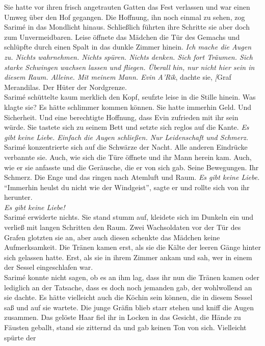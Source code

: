 Sie hatte vor ihren frisch angetrauten Gatten das Fest verlassen und war einen Umweg über den Hof 
gegangen. Die Hoffnung, ihn noch einmal zu sehen, zog Sarimé in das Mondlicht hinaus. Schließlich 
führten ihre Schritte sie aber doch zum Unvermeidbaren. Leise öffnete das Mädchen die Tür des 
Gemachs und schlüpfte durch einen Spalt in das dunkle Zimmer hinein. \textit{Ich mache die Augen 
zu. Nichts wahrnehmen. Nichts spüren. Nichts denken. Sich fort Träumen. Sich starke Schwingen 
wachsen lassen und fliegen. Überall hin, nur nicht hier sein in diesem Raum. Alleine. Mit meinem 
Mann. Evin A'Rik}, dachte sie, \textit[{Graf Merandilas. Der Hüter der Nordgrenze.}\\
Sarimé schüttelte kaum merklich den Kopf, seufzte leise in die Stille hinein. Was klagte sie? 
Es hätte schlimmer kommen können. Sie hatte immerhin Geld. Und Sicherheit. Und eine berechtigte 
Hoffnung, dass Evin zufrieden mit ihr sein würde. Sie tastete sich zu seinem Bett und setzte sich 
reglos auf die Kante. \textit{Es gibt keine Liebe. Einfach die Augen schließen. Nur Leidenschaft 
und Schmerz.}\\
Sarimé konzentrierte sich auf die Schwärze der Nacht. Alle anderen Eindrücke verbannte sie. Auch, 
wie sich die Türe öffnete und ihr Mann herein kam. Auch, wie er sie anfasste und die Geräusche, die 
er von sich gab. Seine Bewegungen. Ihr Schmerz. Die Enge und das ringen nach Atemluft und Raum. 
\textit{Es gibt keine Liebe.}\\
``Immerhin heulst du nicht wie der Windgeist'', sagte er und rollte sich von ihr herunter.\\
\textit{Es gibt keine Liebe!}\\
Sarimé erwiderte nichts. Sie stand stumm auf, kleidete sich im Dunkeln ein und verließ mit langen 
Schritten den Raum. Zwei Wachsoldaten vor der Tür des Grafen glotzten sie an, aber auch diesen 
schenkte das Mädchen keine Aufmerksamkeit. Die Tränen kamen erst, als sie die Kälte der leeren 
Gänge hinter sich gelassen hatte. Erst, als sie in ihrem Zimmer ankam und sah, wer in einem der 
Sessel eingeschlafen war.\\
Sarimé konnte nicht sagen, ob es an ihm lag, dass ihr nun die Tränen kamen oder lediglich an der 
Tatsache, dass es doch noch jemanden gab, der wohlwollend an sie dachte. Es hätte vielleicht auch 
die Köchin sein können, die in diesem Sessel saß und auf sie wartete. Die junge Gräfin blieb starr 
stehen und kniff die Augen zusammen. Das gelöste Haar fiel ihr in Locken in das Gesicht, die Hände 
zu Fäusten geballt, stand sie zitternd da und gab keinen Ton von sich. Vielleicht spürte der 

